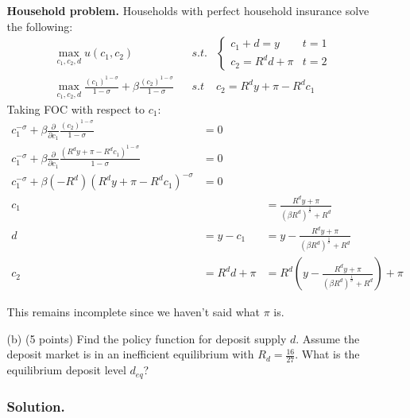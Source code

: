 \documentclass[12pt]{article}
\begin{document}
\begin{enumerate}
\begin{enumerate}
        \textbf{Household problem.} Households with perfect household insurance solve the following: 
        \begin{align*}
            &\max_{c_1,c_2,d} u(c_1,c_2) 
            && s.t. &\begin{cases}
                c_1 + d = y & t=1 \\ c_2 = R^d d + \pi & t=2 
            \end{cases}
            \\ &\max _{c_1,c_2,d} \frac{(c_1)^{1-\sigma}}{1 - \sigma} + \beta \frac{(c_2)^{1-\sigma}}{1 - \sigma} && s.t & c_2 = R^d y + \pi - R^d c_1
        \end{align*}
        Taking FOC with respect to  $c_1$: 
        \begin{align*}
            c_1^{-\sigma} + \beta \frac{\partial }{\partial c_1 }\frac{(c_2)^{1-\sigma}}{1 - \sigma}  &= 0
            \\  c_1^{-\sigma} + \beta \frac{\partial }{\partial c_1 }\frac{( R^d y + \pi - R^d c_1)^{1-\sigma}}{1 - \sigma}  &= 0
            \\ c_1^{-\sigma} + \beta (- R^d) ( R^d y + \pi - R^d c_1)^{-\sigma}&= 0
            \\ c_1 &&= \frac{R^{d}y+\pi}{\left(\beta R^{d}\right)^{\frac{1}{\sigma}}+R^{d}}
            \\ d &= y - c_1  &= y - \frac{R^{d}y+\pi}{\left(\beta R^{d}\right)^{\frac{1}{\sigma}}+R^{d}}
            \\ c_2 &= R^d d + \pi &= R^d \left(  y - \frac{R^{d}y+\pi}{\left(\beta R^{d}\right)^{\frac{1}{\sigma}}+R^{d}}\right)  + \pi
        \end{align*}

        This remains incomplete since we haven't said what $\pi$ is. 

        
        \item[(b)] {(5 points)} Find the policy function for deposit supply $d$. Assume the deposit market is in an inefficient equilibrium with $R_d = \frac{16}{27}$. What is the equilibrium deposit level $d_{eq}$?
        \subsubsection*{Solution.}


\end{enumerate}
\end{enumerate}
\end{document}
